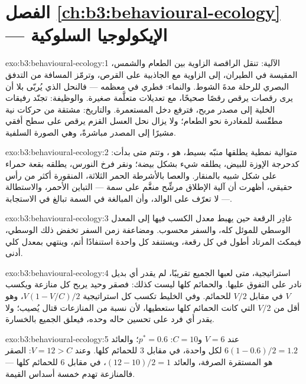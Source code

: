\section*{الفصل \ref{ch:b3:behavioural-ecology} --- الإيكولوجيا السلوكية}

\begin{solution}{exo:b3:behavioural-ecology:1}
الآلية: تنقل الراقصة الزاوية بين الطعام والشمس، المقيسة في
الطيران، إلى الزاوية مع الجاذبية على القرص، وترمّز المسافة
من التدفق البصري للرحلة مدةَ الشوط. والنماء: فطري في معظمه ---
فالنحل الذي يُربّى بلا أن يرى رقصات يرقص رقصًا صحيحًا، مع
تعديلات متعلَّمة صغيرة. والوظيفة: تجنّد رفيقات الخلية إلى
مصدر مربح، فترفع دخل المستعمرة.
والتاريخ: مشتقة من حركات نية مطقّسة للمغادرة نحو
الطعام؛ ولا يزال نحل العسل القزم يرقص على سطح أفقي مشيرًا
إلى المصدر مباشرةً، وهي الصورة السلفية.
\end{solution}

\begin{solution}{exo:b3:behavioural-ecology:2}
 متوالية نمطية يطلقها منبّه
بسيط، هو ، وتتم متى بدأت: كدحرجة الإوزة
للبيض، يطلقه شيء بشكل بيضة؛ ونقر فرخ النورس، يطلقه
بقعة حمراء على شكل شبيه بالمنقار. والعصا بالأشرطة الحمر
الثلاثة، المنقورة أكثر من رأس حقيقي، أظهرت أن آلية
الإطلاق مرشِّح منغَّم على سمة --- التباين الأحمر، والاستطالة ---
لا تعرّف على الوالد، وأن المبالغة في السمة
تبالغ في الاستجابة.
\end{solution}

\begin{solution}{exo:b3:behavioural-ecology:3}
غادِر الرقعة حين يهبط معدل الكسب فيها إلى المعدل الوسطي
للموئل كله، والسفر محسوب. ومضاعفة زمن السفر
تخفض ذلك الوسطي، فيمكث المرتاد أطول في كل رقعة،
ويستنفد كل واحدة استنفادًا أتم، وينتهي بمعدل كلي أدنى.
\end{solution}

\begin{solution}{exo:b3:behavioural-ecology:4}
 استراتيجية، متى لعبها الجميع
تقريبًا، لم يقدر أي بديل نادر على التفوق عليها. والحمائم
كلها ليست كذلك: فصقر وحيد يربح كل منازعة ويكسب $V$ في
مقابل $V/2$ للحمائم. وفي الخليط تكسب كل استراتيجية $V(1 - V/C)/2$،
وهو أقل من $V/2$ التي كانت الحمائم كلها ستعطيها،
لأن نسبة من المنازعات قتال يُصيب؛ ولا يقدر أي فرد
على تحسين حاله وحده، فيعلق الجميع بالخسارة.
\end{solution}

\begin{solution}{exo:b3:behavioural-ecology:5}
عند $V = 6$ و$C = 10$: $p^{*} = 0.6$؛ والعائد $6(1 - 0.6)/2 = 1.2$ لكل
واحدة، في مقابل $3$ للحمائم كلها. وعند $V = 12 > C$: الصقر هو المستقرة
الصرفة، والعائد $(12 - 10)/2 = 1$، في مقابل $6$ للحمائم كلها --- فالمنازعة
تهدم خمسة أسداس القيمة.
\end{solution}

